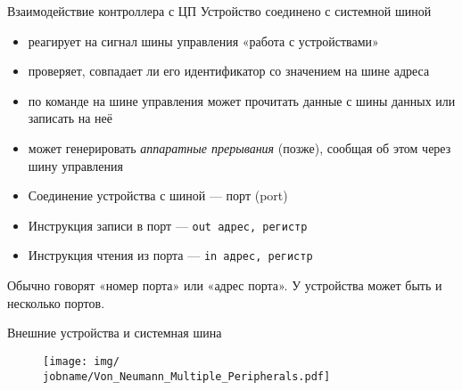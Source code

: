 \documentclass[xetex,aspectratio=43]{beamer}
\begin{document}
\begin{frame}[fragile]{Взаимодействие контроллера с ЦП}
	Устройство соединено с системной шиной

	\begin{itemize}
		\tightlist
		\item
		реагирует на сигнал шины управления «работа с устройствами»
		\item
		проверяет, совпадает ли его идентификатор со значением на шине адреса
		\item
		по команде на шине управления может прочитать данные с шины данных или записать на неё
		\item
		может генерировать \emph{аппаратные прерывания} (позже), сообщая об этом через шину управления
	\end{itemize}


	\begin{itemize}
		\tightlist
		\item
		Соединение устройства с шиной --- порт (port)
		\item
		Инструкция записи в порт --- \texttt{out\ адрес,\ регистр}
		\item
		Инструкция чтения из порта --- \texttt{in\ адрес,\ регистр}
	\end{itemize}


	Обычно говорят «номер порта» или «адрес порта». У устройства может быть
	и несколько портов.
\end{frame}

\begin{frame}{Внешние устройства и системная шина}
    \begin{figure}
    \texttt{[image: img/\\jobname/Von\_Neumann\_Multiple\_Peripherals.pdf]}
\end{figure}
\end{frame}
\end{document}
